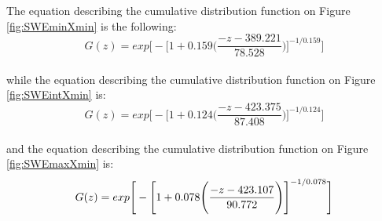 \documentclass[12pt]{article}
\begin{document}
        The equation describing the cumulative distribution function on Figure \ref{fig:SWEminXmin} is the following:
        \begin{equation}
            G(z) = exp\Bigg [-\Bigg [1+0.159 \Bigg (\frac{-z-389.221}{78.528}\Bigg )\Bigg ]^{-1/0.159}\Bigg ]
        \end{equation}\\
        while the equation describing the cumulative distribution function on Figure \ref{fig:SWEintXmin} is:
        \begin{equation}
            G(z) = exp\Bigg [-\Bigg [1+0.124 \Bigg (\frac{-z-423.375}{87.408}\Bigg )\Bigg ]^{-1/0.124}\Bigg ]
        \end{equation}\\
        and the equation describing the cumulative distribution function on Figure \ref{fig:SWEmaxXmin} is:
        \begin{equation}\\
            G(z) = exp\Bigg [-\Bigg [1+0.078 \Bigg (\frac{-z-423.107}{90.772}\Bigg )\Bigg ]^{-1/0.078}\Bigg ]
        \end{equation}\\
\end{document}
